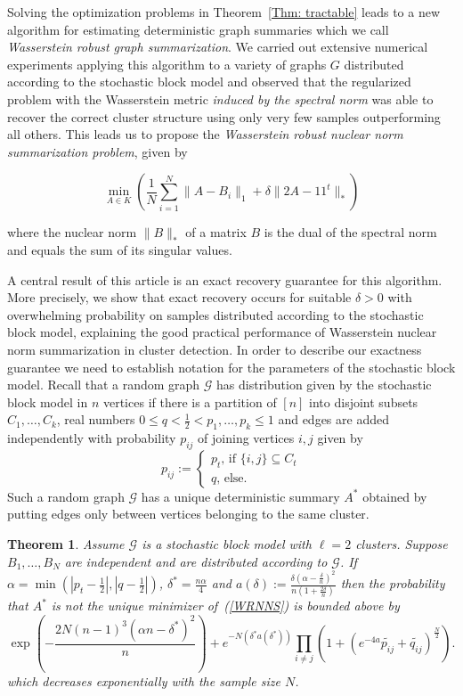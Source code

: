 \documentclass[12pt]{amsart}
\newtheorem{theorem}[lemma]{Theorem}
\theoremstyle{remark}
\newcommand{\grG}{{\mathcal{G}}}
\begin{document}
Solving the optimization problems in Theorem~\ref{Thm: tractable} leads to a new algorithm for estimating deterministic graph summaries which we call {\it Wasserstein robust graph summarization}. We carried out extensive numerical experiments applying this algorithm to a variety of graphs $G$ distributed according to the stochastic block model and observed that the regularized problem with the Wasserstein metric {\it induced by the spectral norm} was able to recover the correct cluster structure using only very few samples outperforming all others. This leads us to propose the {\it Wasserstein robust nuclear norm summarization problem}, given by

\begin{equation}\label{WRNNS}
\min_{A\in K} \left(\frac{1}{N}\sum_{i=1}^N\|A-B_i\|_1+ \delta\|2A-11^t\|_*\right) 
\end{equation}

where the nuclear norm $\|B\|_*$ of a matrix $B$ is the dual of the spectral norm and equals the sum of its singular values.

A central result of this article is an exact recovery guarantee for this algorithm. 
More precisely, we show that exact recovery occurs for suitable $\delta>0$ with overwhelming probability on samples distributed according to the stochastic block model, explaining the good practical performance of Wasserstein nuclear norm summarization in cluster detection. In order to describe our exactness guarantee we need to establish notation for the parameters of the stochastic block model. Recall that a random graph $\grG$ has distribution given by the stochastic block model in $n$ vertices if there is a partition of $[n]$ into disjoint subsets $C_1,\dots, C_k$, real numbers $0\leq q<\frac{1}{2}<p_1,\dots, p_k\leq 1$ and edges are added independently with probability $p_{ij}$ of joining vertices $i,j$ given by
\[p_{ij}:=\begin{cases}
p_t\text{, if $\{i,j\}\subseteq C_t$}\\
q\text{, else.}
\end{cases}
\] 
Such a random graph $\grG$ has a unique deterministic summary $A^*$ obtained by putting edges only between vertices belonging to the same cluster.

\begin{theorem}\label{thm. performance} Assume $\grG$ is a stochastic block model with $\ell=2$ clusters. Suppose $B_1,\dots, B_N$ are independent and are distributed according to $\grG$. If $\alpha = \min (|p_t-\frac{1}{2}|, |q-\frac{1}{2}|)$, $\delta^*=\frac{n\alpha}{4}$ and $a(\delta):=\frac{\delta\left(\alpha-\frac{\delta}{n}\right)^2}{n\left(1+\frac{2\delta}{n}\right)}$ then the probability that $A^*$ is not the unique minimizer of~(\ref{WRNNS}) is bounded above by
\[ \exp\left(-\frac{2N(n-1)^3(\alpha n-\delta^*)^2}{n}\right) + e^{-N\left(\delta^* a(\delta^*)\right)}\prod_{i\neq j}\left(1+ (e^{-4a}\widetilde{p_{ij}}+\widetilde{q_{ij}})^{\frac{N}{2}}\right).\] 
which decreases exponentially with the sample size $N$.
\end{theorem}
\end{document}
